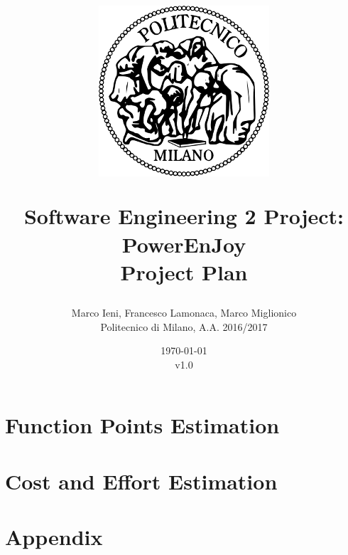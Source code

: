 \documentclass[a4paper, 12pt]{report}
\title{
	\begin{figure}[h]
		\centering
		\includegraphics{../common_resources/logo_polimi.png}
	\end{figure}
	\vspace{30px}
	Software Engineering 2 Project: PowerEnJoy \\ \vspace{1em}
	\textbf{P}roject \textbf{P}lan
}
\author{Marco Ieni, Francesco Lamonaca, Marco Miglionico\\Politecnico di Milano, A.A. 2016/2017}
\date{\today\\v1.0}
\begin{document}
\maketitle
\tableofcontents

\chapter{Function Points Estimation}
\label{ch:function_points_estimation}








\chapter{Cost and Effort Estimation}
\label{ch:cost_effor_estimation}



\appendix
\chapter{Appendix}

\end{document}
